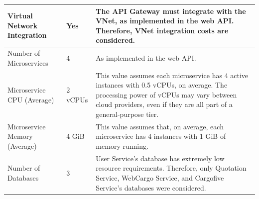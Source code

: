 \documentclass[12pt, reqno]{amsbook}
\theoremstyle{definition}
\theoremstyle{definition}
\numberwithin{section}{chapter}
\numberwithin{table}{chapter}
\numberwithin{figure}{chapter}
\begin{document}
\begin{longtable}{|M{70pt}|M{55pt}|m{300pt}|}
  \hline
  Virtual Network Integration
   & Yes
   & The \ac{API} Gateway must integrate with the \ac{VNet}, as implemented in the web \ac{API}. Therefore, \ac{VNet} integration costs are considered.                                                                                                                                                                                                                                                                                                                                  \\
  \hline
  Number of Microservices
   & 4
   & As implemented in the web \ac{API}.                                                                                                                                                                                                                                                                                                                                                                                                                                                 \\
  \hline
  Microservice CPU (Average)
   & 2 vCPUs
   & This value assumes each microservice has 4 active instances with 0.5 \acp{vCPU}, on average. The processing power of \acp{vCPU} may vary between cloud providers, even if they are all part of a general-purpose tier.                                                                                                                                                                                                                                                              \\
  \hline
  Microservice Memory (Average)
   & 4 GiB
   & This value assumes that, on average, each microservice has 4 instances with 1 \ac{GiB} of memory running.                                                                                                                                                                                                                                                                                                                                                                           \\
  \hline
  Number of Databases
   & 3
   & User Service's database has extremely low resource requirements. Therefore, only Quotation Service, WebCargo Service, and Cargofive Service's databases were considered.                                                                                                                                                                                                                                                                                                            \\

\end{longtable}
\end{document}
